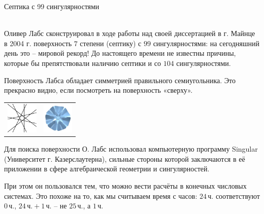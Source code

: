 \documentclass[ru]{./../../common/SurferDesc}%
\begin{document}
\footnotesize


\begin{surferPage}
  \begin{surferTitle}Септика с 99 сингулярностями\end{surferTitle}   \\
  
Оливер Лабс сконструировал в ходе работы над своей диссертацией в г. Майнце в 2004 г. поверхность $7$ степени (септику) с $99$ сингулярностями: на сегодняшний день это – мировой рекорд! До настоящего времени не известны причины, которые бы препятствовали наличию септики и со $104$ сингулярностями. 

Поверхность Лабса обладает симметрией правильного семиугольника. Это прекрасно видно, если посмотреть на поверхность «сверху». 
    \vspace*{-0.3em}
    \begin{center}
      \begin{tabular}{c@{\qquad}c}
        \includegraphics[height=1.5cm]{./../../common/images/labsseptic1.pdf}
        &
        \includegraphics[height=1.5cm]{./../../common/images/labs_septic_von_oben}
      \end{tabular}
    \end{center}
    \vspace*{-0.3em}

Для поиска поверхности О. Лабс использовал компьютерную программу {\sc Singular} (Университет г. Казерслаутерна), сильные стороны которой заключаются в её приложении в сфере алгебраической геометрии и сингулярностей.

При этом он пользовался тем, что можно вести расчёты в конечных числовых системах. Это похоже на то, как мы считываем время с часов: $24\,$ч. соответствуют $0\,$ч., $24\,\text{ч}. + 1\,$ч. – не $25\,$ч., а $1\,$ч.

     
\end{surferPage}
\end{document}
